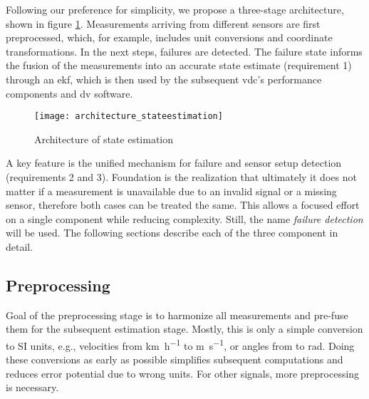 Following our preference for simplicity, we propose a three-stage architecture, shown in figure \ref{fig:architecture-stateestimation}. Measurements arriving from different sensors are first preprocessed, which, for example, includes unit conversions and coordinate transformations. In the next steps, failures are detected. The failure state informs the fusion of the measurements into an accurate state estimate (requirement 1) through an \gls{ekf}, which is then used by the subsequent \gls{vdc}'s performance components and \gls{dv} software.

\begin{figure}
	\centering
	\texttt{[image: architecture\_stateestimation]}%
	\caption{Architecture of state estimation}
	\label{fig:architecture-stateestimation}
\end{figure}

A key feature is the unified mechanism for failure and sensor setup detection (requirements 2 and 3). Foundation is the realization that ultimately it does not matter if a measurement is unavailable due to an invalid signal or a missing sensor, therefore both cases can be treated the same. This allows a focused effort on a single component while reducing complexity. Still, the name \textit{failure detection} will be used. The following sections describe each of the three component in detail.


\subsection{Preprocessing}
Goal of the preprocessing stage is to harmonize all measurements and pre-fuse them for the subsequent estimation stage. Mostly, this is only a simple conversion to SI units, e.g., velocities from \si{\kilo\meter\per\hour} to \si{\meter\per\second}, or angles from \si{\deg} to \si{\radian}. Doing these conversions as early as possible simplifies subsequent computations and reduces error potential due to wrong units. For other signals, more preprocessing is necessary.

